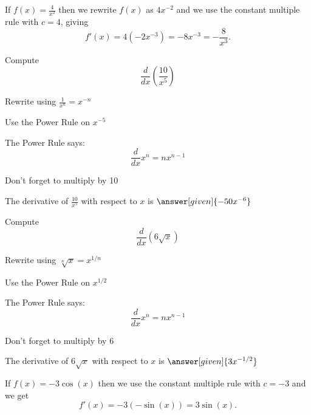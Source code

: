 \documentclass{ximera}
\begin{document}
\begin{example} %
 If $f(x) = \frac{4}{x^2}$ then we rewrite $f(x)$ as $4x^{-2}$  and we use the constant multiple rule with $c = 4$, 
giving 
\[f'(x) = 4 (-2x^{-3}) = -8x^{-3} = -\frac{8}{x^3}.
\]
\end{example}

\begin{problem} %
  Compute 
  \[
  \frac{d}{dx} \left(\frac{10}{x^5}\right)
  \]
  
    \begin{hint}
		  Rewrite using $\frac{1}{x^n} = x^{-n}$
		\end{hint}
		\begin{hint}
      Use the Power Rule on $x^{-5}$
    \end{hint}
    \begin{hint}
      The Power Rule says:
      \[
      \frac{d}{dx} x^n = nx^{n-1}
      \]
    \end{hint}
		\begin{hint}
		  Don't forget to multiply by 10
		\end{hint}
		
		The derivative of $\frac{10}{x^5}$ with respect to $x$ is
		 $\answer[given]{-50x^{-6}}$
	
\end{problem}


\begin{problem} %
  Compute 
  \[
  \frac{d}{dx} \left(6\sqrt x\right)
  \]
  
    \begin{hint}
		  Rewrite using $\sqrt[n] x = x^{1/n}$
		\end{hint}
		\begin{hint}
      Use the Power Rule on $x^{1/2}$
    \end{hint}
    \begin{hint}
      The Power Rule says:
      \[
      \frac{d}{dx} x^n = nx^{n-1}
      \]
    \end{hint}
		\begin{hint}
		  Don't forget to multiply by 6
		\end{hint}
		
		The derivative of $6\sqrt x$ with respect to $x$ is
		 $\answer[given]{3x^{-1/2}}$
	
\end{problem}


\begin{example} %
 If $f(x) = -3\cos(x)$ then we use the constant multiple rule with $c = -3$ and we get 
\[
f'(x) = -3(-\sin(x)) = 3\sin(x).
\]
\end{example}
\end{document}
